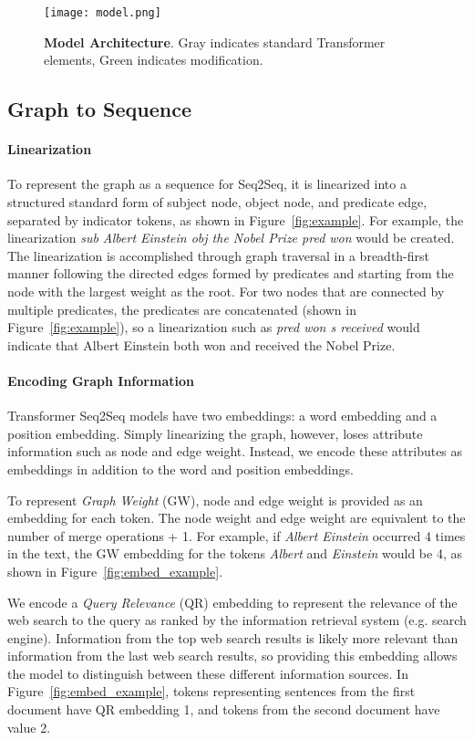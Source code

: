 \documentclass[11pt,a4paper]{article}
\begin{document}
\begin{figure}[t!]
    \centering
    \texttt{[image: model.png]}
    \caption{\textbf{Model Architecture}. Gray indicates standard Transformer elements, Green indicates modification.}
    \label{fig:model_architecture}
\end{figure}

\subsection{Graph to Sequence} 

\paragraph{Linearization} To represent the graph as a sequence for Seq2Seq, it is linearized into a structured standard form of subject node, object node, and predicate edge, separated by indicator tokens, as shown in Figure~\ref{fig:example}. For example, the linearization \textit{sub Albert Einstein obj the Nobel Prize pred won} would be created. The linearization is accomplished through graph traversal in a breadth-first manner following the directed edges formed by predicates and starting from the node with the largest weight as the root. For two nodes that are connected by multiple predicates, the predicates are concatenated (shown in Figure~\ref{fig:example}), so a linearization such as \textit{pred won s received} would indicate that Albert Einstein both won and received the Nobel Prize. 

\paragraph{Encoding Graph Information} Transformer Seq2Seq models have two embeddings: a word embedding and a position embedding. Simply linearizing the graph, however, loses attribute information such as node and edge weight. Instead, we encode these attributes as embeddings in addition to the word and position embeddings. 

To represent \textit{Graph Weight} (GW), node and edge weight is provided as an embedding for each token. The node weight and edge weight are equivalent to the number of merge operations + 1. For example, if \textit{Albert Einstein} occurred 4 times in the text, the GW embedding for the tokens \textit{Albert} and \textit{Einstein} would be 4, as shown in Figure~\ref{fig:embed_example}. 

We encode a \textit{Query Relevance} (QR) embedding to represent the relevance of the web search to the query as ranked by the information retrieval system (e.g. search engine). Information from the top web search results is likely more relevant than information from the last web search results, so providing this embedding allows the model to distinguish between these different information sources. In Figure~\ref{fig:embed_example}, tokens representing sentences from the first document have QR embedding 1, and tokens from the second document have value 2. 
\end{document}
